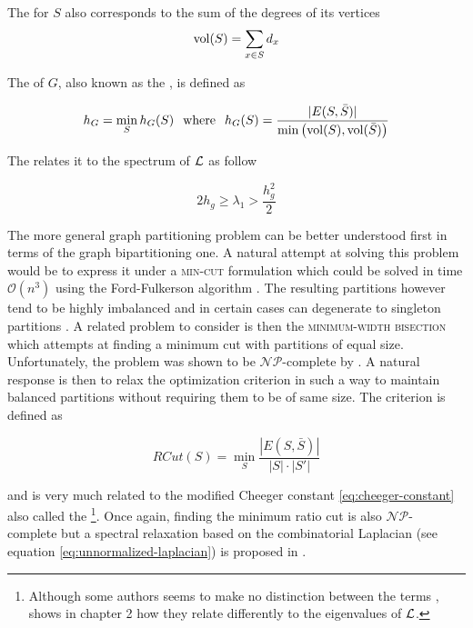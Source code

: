 The  for $S$ also corresponds to the sum of the degrees of its vertices
\begin{equation}
\operatorname{\text{vol}}(S) = \sum_{x \in S} d_x
\end{equation}

The  of $G$, also known as the  \cite{Chung1997}, is defined as

\begin{equation}
h_G = \min_S h_G(S) \hspace{2.5mm} \text{where} \hspace{2.5mm} h_G(S) = \frac{ |E(S, \bar{S}) |}{\min \left( \operatorname{\text{vol}}(S), \operatorname{\text{vol}}(\bar{S}) \right)}
\label{eq:cheeger-constant}
\end{equation}

The  relates it to the spectrum of $\mathbf{\mathcal{L}}$ as follow \cite{Chung1997}
\begin{lem}
\begin{equation}
2h_g \geq \lambda_1 > \frac{h_g^2}{2}
\end{equation}
\end{lem}

The more general graph partitioning problem can be better understood first in terms of
the graph bipartitioning one. A natural attempt at solving this problem would be to
express it under a \textsc{min-cut} formulation which could be solved in time
$\mathcal{O}(n^3)$ using the Ford-Fulkerson algorithm \cite{FordFulkerson1956}. The
resulting partitions however tend to be highly imbalanced and in certain cases can
degenerate to singleton partitions \cite{Hagen1992}. A related problem to consider is
then the \textsc{minimum-width bisection} which attempts at finding a minimum cut
with partitions of equal size. Unfortunately, the problem was shown to be
$\mathcal{NP}$-complete by \cite{Garey1976}. A natural response is then to relax the
optimization criterion in such a way to maintain balanced partitions without requiring
them to be of same size. The  criterion is defined as \cite{Chuen1989, Chuen1991, Hagen1992} 

\begin{equation}
RCut(S) = \min_S \frac{|E(S, \bar{S})|}{|S| \cdot |S'|}
\end{equation}

and is very much related to the modified Cheeger constant \ref{eq:cheeger-constant}
also called the  \footnote{Although some authors seems
to make no distinction between the terms \cite{ShiMalik2000, Levin2008},
\cite{Chung1997} shows in chapter 2 how they relate differently to the eigenvalues of
$\mathbf{\mathcal{L}}$.}. Once again,  finding the minimum ratio cut is also $\mathcal{NP}$-
complete but a spectral relaxation based on the combinatorial Laplacian (see equation
\ref{eq:unnormalized-laplacian}) is proposed in \cite{Hagen1992}.

